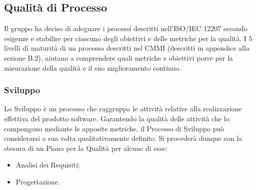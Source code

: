 \subsection{Qualità di Processo}
Il gruppo ha deciso di adeguare i processi descritti nell'ISO/IEC 12207 secondo esigenze e stabilire per ciascuno degli obiettivi e delle metriche per la qualità. I 5 livelli di maturità di un processo descritti nel CMMI (descritti in appendice alla sezione \textsection B.2), aiutano a comprendere quali metriche e obiettivi porre per la misurazione della qualità e il suo miglioramento continuo.
\subsubsection{Sviluppo}
Lo Sviluppo è un processo che raggruppa le attività relative alla realizzazione effettiva del prodotto software. Garantendo la qualità delle attività che lo compongono mediante le apposite metriche, il Processo di Sviluppo può considerarsi a sua volta qualitativamente definito. Si procederà dunque con la stesura di un Piano per la Qualità per alcune di esse:
\begin{itemize}
	\item Analisi dei Requisiti;
	\item Progettazione.
\end{itemize}
